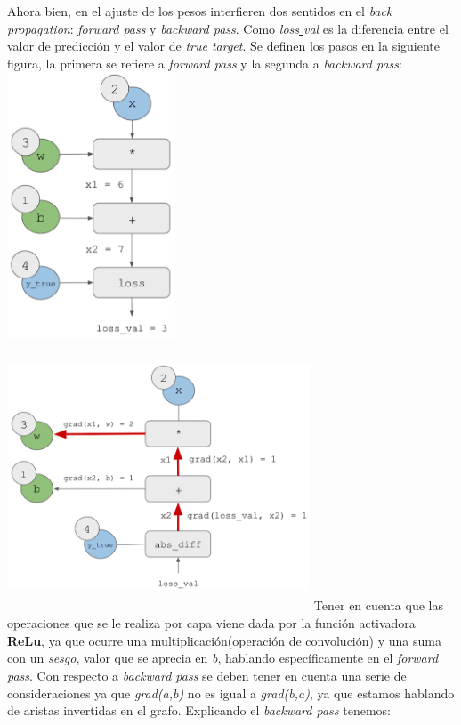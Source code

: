 \documentclass{book}
\begin{document}
			Ahora bien, en el ajuste de los pesos interfieren dos sentidos en el \textit{back propagation}: \textit{forward pass} y \textit{backward pass}. Como \textit{loss\underline{ }val} es la diferencia entre el valor de predicci\'on y el valor de \textit{true target}. Se definen los pasos en la siguiente figura, la primera se refiere a \textit{forward pass} y la segunda a \textit{backward pass}: \\
				\includegraphics[width=5cm]{12.png}
				\includegraphics[width=9cm, height=8cm]{14.png}
			Tener en cuenta que las operaciones que se le realiza por capa viene dada por la funci\'on activadora \textbf{ReLu}, ya que ocurre una multiplicaci\'on(operaci\'on de convoluci\'on) y una suma con un \textit{sesgo}, valor que se aprecia en \textit{b}, hablando espec\'ificamente en el \textit{forward pass}. Con respecto a \textit{backward pass} se deben tener en cuenta una serie de consideraciones ya que \textit{grad(a,b)} no es igual a \textit{grad(b,a)}, ya que estamos hablando de aristas invertidas en el grafo. Explicando el \textit{backward pass} tenemos:
\end{document}
